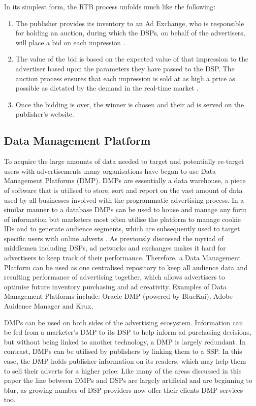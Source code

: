 \documentclass{article}
\begin{document}
In its simplest form, the RTB process unfolds much like the following: 
\begin{enumerate}
\item The publisher provides its inventory to an Ad Exchange, who is responsible for holding an auction, during which the DSPs, on behalf of the advertisers, will place a bid on each impression \parencite{howRTBWorks}. 
\item The value of the bid is based on the expected value of that impression to the advertiser based upon the parameters they have passed to the DSP. The auction process ensures that each impression is sold at as high a price as possible as dictated by the demand in the real-time market \parencite{howRTBWorks}. 
\item Once the bidding is over, the winner is chosen and their ad is served on the publisher's website. 
\end{enumerate}

\subsection{Data Management Platform}
To acquire the large amounts of data needed to target and potentially re-target users with advertisements many organisations have began to use Data Management Platforms (DMP). DMPs are essentially a data warehouse, a piece of software that is utilised to store, sort and report on the vast amount of data used by all businesses involved with the programmatic advertising process. In a similar manner to a database DMPs can be used to house and manage any form of information but marketers most often utilise the platform to manage cookie IDs and to generate audience segments, which are subsequently used to target specific users with online adverts \parencite{DMP}. As previously discussed the myriad of middlemen including DSPs, ad networks and exchanges makes it hard for advertisers to keep track of their performance. Therefore, a Data Management Platform can be used as one centralised repository to keep all audience data and resulting performance of advertising together, which allows advertisers to optimise future inventory purchasing and ad creativity. Examples of Data Management Platforms include: Oracle DMP (powered by BlueKai), Adobe Auidence Manager and Krux. \newline

DMPs can be used on both sides of the advertising ecosystem. Information can be fed from a marketer's DMP to its DSP to help inform ad purchasing decisions, but without being linked to another technology, a DMP is largely redundant. In contrast, DMPs can be 
utilised by publishers by linking them to a SSP. In this case, the DMP holds publisher information on its readers, which may help them to sell their adverts for a higher price. Like many of the areas discussed in this paper the line between DMPs and DSPs are largely artificial and are beginning to blur, as growing number of DSP providers now offer their clients DMP services too.  
\end{document}
